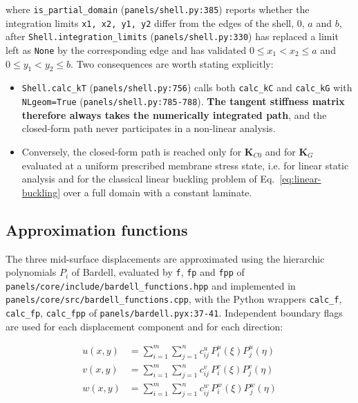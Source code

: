 \noindent where \texttt{is\_partial\_domain} (\texttt{panels/shell.py:385}) reports whether the integration limits \texttt{x1, x2, y1, y2} differ from the edges of the shell, $0$, $a$ and $b$, after \texttt{Shell.integration\_limits} (\texttt{panels/shell.py:330}) has replaced a limit left as \texttt{None} by the corresponding edge and has validated $0 \le x_1 < x_2 \le a$ and $0 \le y_1 < y_2 \le b$. Two consequences are worth stating explicitly:

\begin{itemize}
	\item \texttt{Shell.calc\_kT} (\texttt{panels/shell.py:756}) calls both \texttt{calc\_kC} and \texttt{calc\_kG} with \texttt{NLgeom=True} (\texttt{panels/shell.py:785-788}). \textbf{The tangent stiffness matrix therefore always takes the numerically integrated path}, and the closed-form path never participates in a non-linear analysis.
	\item Conversely, the closed-form path is reached only for $\boldsymbol{K}_{C0}$ and for $\boldsymbol{K}_G$ evaluated at a uniform prescribed membrane stress state, i.e. for linear static analysis and for the classical linear buckling problem of Eq.~\ref{eq:linear-buckling} over a full domain with a constant laminate.
\end{itemize}

\subsection{Approximation functions}

The three mid-surface displacements are approximated using the hierarchic polynomials $P_i$ of Bardell, evaluated by \texttt{f}, \texttt{fp} and \texttt{fpp} of \texttt{panels/core/include/bardell\_functions.hpp} and implemented in \texttt{panels/core/src/bardell\_functions.cpp}, with the Python wrappers \texttt{calc\_f}, \texttt{calc\_fp}, \texttt{calc\_fpp} of \texttt{panels/bardell.pyx:37-41}. Independent boundary flags are used for each displacement component and for each direction:

\begin{equation}\label{eq:tangent-donnell-approx}
	\begin{aligned}
		u(x,y) &= \sum_{i=1}^{m} \sum_{j=1}^{n} c_{ij}^u \, P_i^u(\xi) P_j^u(\eta) \\
		v(x,y) &= \sum_{i=1}^{m} \sum_{j=1}^{n} c_{ij}^v \, P_i^v(\xi) P_j^v(\eta) \\
		w(x,y) &= \sum_{i=1}^{m} \sum_{j=1}^{n} c_{ij}^w \, P_i^w(\xi) P_j^w(\eta)
	\end{aligned}
\end{equation}

